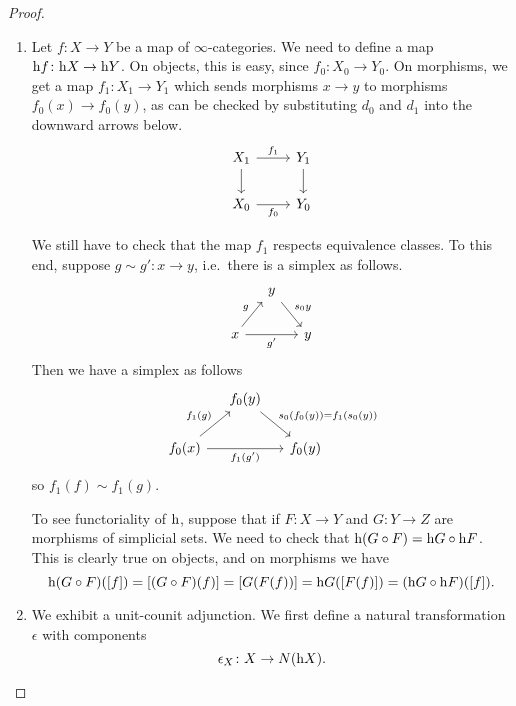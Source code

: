 \documentclass[main.tex]{subfiles}
\begin{document}
\begin{proof}
  $\,$
  \begin{enumerate}
    \item Let $f\colon X \to Y$ be a map of $\infty$-categories. We need to define a map $\mathrm{h} f\colon \mathrm{h} X \to \mathrm{h} Y$. On objects, this is easy, since $f_{0}\colon X_{0} \to Y_{0}$. On morphisms, we get a map $f_{1}\colon X_{1} \to Y_{1}$ which sends morphisms $x \to y$ to morphisms $f_{0}(x) \to f_{0}(y)$, as can be checked by substituting $d_{0}$ and $d_{1}$ into the downward arrows below.
      \begin{equation*}
        \begin{tikzcd}
          X_{1}
          \arrow[r, "f_{1}"]
          \arrow[d]
          & Y_{1}
          \arrow[d]
          \\
          X_{0}
          \arrow[r, swap, "f_{0}"]
          & Y_{0}
        \end{tikzcd}
      \end{equation*}

      We still have to check that the map $f_{1}$ respects equivalence classes. To this end, suppose $g \sim g'\colon x \to y$, i.e.\ there is a simplex as follows.
      \begin{equation*}
        \begin{tikzcd}[column sep=small]
          & y
          \arrow[dr, "s_{0}y"]
          \\
          x
          \arrow[ur, "g"]
          \arrow[rr, swap, "g'"]
          && y
        \end{tikzcd}
      \end{equation*}
      Then we have a simplex as follows
      \begin{equation*}
        \begin{tikzcd}[column sep=small]
          & f_{0}(y)
          \arrow[dr, "s_{0}(f_{0}(y)) = f_{1}(s_{0}(y))"]
          \\
          f_{0}(x)
          \arrow[ur, "f_{1}(g)"]
          \arrow[rr, swap, "f_{1}(g')"]
          && f_{0}(y)
        \end{tikzcd}
      \end{equation*}
      so $f_{1}(f) \sim f_{1}(g)$.

      To see functoriality of $\mathrm{h}$, suppose that if $F\colon X \to Y$ and $G\colon Y \to Z$ are morphisms of simplicial sets. We need to check that $\mathrm{h}(G \circ F) = \mathrm{h} G \circ \mathrm{h} F$. This is clearly true on objects, and on morphisms we have
      \begin{equation*}
        \mathrm{h}(G \circ F)([f]) = [(G \circ F)(f)] = [G(F(f))] = \mathrm{h} G([F(f)]) = (\mathrm{h} G \circ \mathrm{h} F) ([f]).
      \end{equation*}

    \item We exhibit a unit-counit adjunction. We first define a natural transformation $\epsilon$ with components
      \begin{equation*}
        \epsilon_{X}\colon X \to N(\mathrm{h} X).
      \end{equation*}
  \end{enumerate}
\end{proof}
\end{document}
